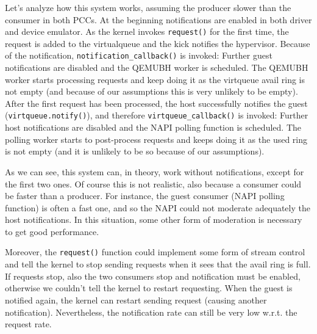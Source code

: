 \vspace{0.5cm}

Let's analyze how this system works, assuming the producer slower than the consumer in both PCCs. At the beginning notifications are 
enabled in both driver and device emulator. As the kernel invokes \texttt{request()} for the first time, the request is added to the 
virtualqueue and the kick notifies the hypervisor. Because of the
notification, \texttt{notification\_callback()} is invoked: Further guest notifications are disabled and the QEMUBH worker is
scheduled. The QEMUBH worker starts processing requests and keep doing it as the virtqueue avail ring is not empty (and because of our 
assumptions this is very unlikely to be empty). After the first request has been processed, the host successfully notifies the guest 
(\texttt{virtqueue.notify()}), and therefore \texttt{virtqueue\_callback()} is invoked: Further host notifications are disabled and the
NAPI polling function is scheduled. The polling worker starts to post-process requests and keeps doing it as the used ring is not empty 
(and it is unlikely to be so because of our assumptions). 

\vspace{0.5cm}

As we can see, this system can, in theory, work without notifications, except for the first two ones. Of course this is not realistic, also
because a consumer could be faster than a producer. For instance, the guest consumer (NAPI polling function) is often a fast one, and
so the NAPI could not moderate adequately the host notifications. In this situation, some other form of moderation is necessary to get
good performance.

Moreover, the \texttt{request()} function could implement some form of stream control and tell the kernel to stop sending requests when it
sees that the avail ring is full. If requests stop, also the two consumers stop and notification must be enabled, otherwise we couldn't
tell the kernel to restart requesting. When the guest is notified again, the kernel can restart sending request 
(causing another notification). Nevertheless, the notification rate can still be very low w.r.t. the request rate.


